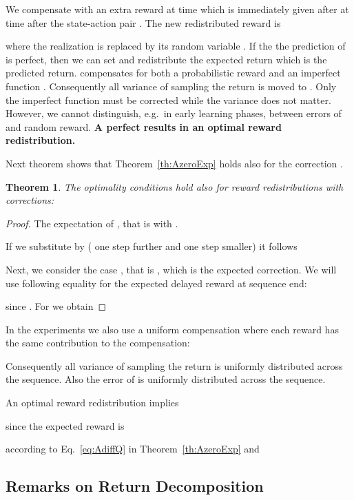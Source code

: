\documentclass{article}
\newtheorem{theoremA}{Theorem}
\begin{document}
\begin{appendices}
We compensate with an extra reward  at time  
which is immediately given
after  at time  after the state-action pair .
The new redistributed reward  is 

where the realization  is replaced by its
random variable .
If the the prediction of  is perfect, then we can set
 and redistribute the expected return which is
the predicted return.
 compensates for both a probabilistic reward  
and an imperfect function .
Consequently all variance of sampling the return is moved to  .
Only the imperfect function  must be corrected while the variance
does not matter. 
However, we cannot distinguish, e.g.\ in early learning phases, 
between errors of  and random reward. 
{\bf A perfect  results in an optimal reward redistribution.}

Next theorem
shows that Theorem~\ref{th:AzeroExp} holds also for
the correction . 
\begin{theoremA}
\label{th:AzeroExpCorr}
The optimality conditions
hold also for reward redistributions with corrections:
 
\end{theoremA}

\begin{proof}
The expectation of 
, 
that is  with .

If we substitute  by  ( one step further and  one step smaller)
it follows 
 

Next, we consider the case , that is , 
which is the expected correction.
We will use following equality for the 
expected delayed reward at sequence end:
 
since  .
For  we obtain
 

\end{proof}

In the experiments we also use a uniform compensation 
where each reward has the same
contribution to the compensation:

Consequently all variance of sampling the return is 
uniformly distributed across
the sequence. Also the error of  is uniformly distributed 
across the sequence.

An optimal reward redistribution implies
 
since the expected reward is
 
according to Eq.~\eqref{eq:AdiffQ} in Theorem~\ref{th:AzeroExp}
and 
 




\subsection{Remarks on Return Decomposition}
\label{sec:Aremark}


\end{appendices}
\end{document}
